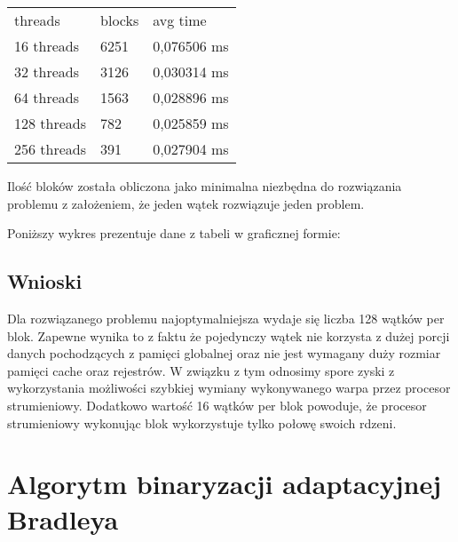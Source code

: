 \documentclass[12pt]{article}
\begin{document}
			\begin{table}[htb]
			\begin{tabular}{lll}
				\rowcolor[HTML]{cccccc} 
				threads     & blocks	&  avg time\\
	 			16  threads	& 6251		&	0,076506 ms \\
	 			32  threads	& 3126		&	0,030314 ms \\
	 			64  threads	& 1563		&	0,028896 ms \\
	 			128 threads	&  782		&	0,025859 ms \\
	 			256 threads	&  391		&	0,027904 ms
			\end{tabular}
			\end{table} 
		
			Ilość bloków została obliczona jako minimalna niezbędna do rozwiązania problemu z założeniem, że jeden wątek rozwiązuje jeden problem. \newline
 	
 			Poniższy wykres prezentuje dane z tabeli w graficznej formie:
 		
 			\begin{bchart}[step=0.05, max=0.10, unit=ms]
 			\end{bchart}	
 		
 		\subsection{Wnioski}
 			Dla rozwiązanego problemu najoptymalniejsza wydaje się liczba 128 wątków per blok. Zapewne wynika to z faktu że pojedynczy wątek nie korzysta z dużej porcji danych pochodzących z pamięci globalnej oraz nie jest wymagany duży rozmiar pamięci cache oraz rejestrów. W związku z tym odnosimy spore zyski z wykorzystania możliwości szybkiej wymiany wykonywanego warpa przez procesor strumieniowy. Dodatkowo wartość 16 wątków per blok powoduje, że procesor strumieniowy wykonując blok wykorzystuje tylko połowę swoich rdzeni.
	
	\section{Algorytm binaryzacji adaptacyjnej Bradleya}
	
\end{document}
